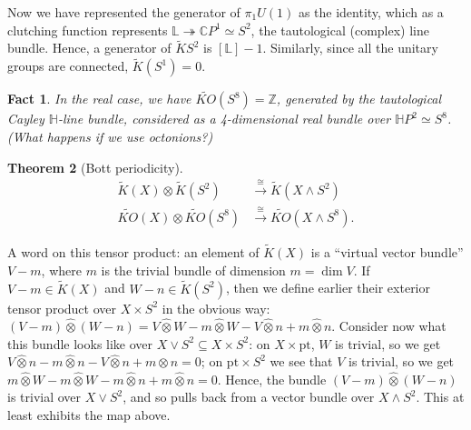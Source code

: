 \documentclass{article}
\newcommand{\Z}{\mathbb{Z}}
\newcommand{\C}{\mathbb{C}}
\newcommand{\CP}{\C P}
\newcommand{\bundle}[1]{\mathbb{#1}}
\newcommand{\sprod}{\wedge}
\newcommand{\wsum}{\vee}
\newcommand{\ptspace}{\mathrm{pt}}
\newcommand{\onto}{\twoheadrightarrow}
\renewcommand{\to}{\longrightarrow}
\newtheorem{thm}{Theorem}[section]
\newtheorem{fact}[thm]{Fact}
\theoremstyle{definition}
\begin{document}
Now we have represented the generator of $\pi_1 U(1)$ as the identity, which as a clutching function represents $\bundle{L} \onto \CP^1 \simeq S^2$, the tautological (complex) line bundle.  Hence, a generator of $\widetilde K S^2$ is $[\bundle L] - 1$.  Similarly, since all the unitary groups are connected, $\widetilde K(S^1) = 0$.

\begin{fact}
In the real case, we have $\widetilde{KO}(S^8) = \Z$, generated by the tautological Cayley $\mathbb{H}$-line bundle, considered as a 4-dimensional real bundle over $\mathbb{H}P^2 \simeq S^8$. (What happens if we use octonions?) %
\end{fact}

\begin{thm}[Bott periodicity]
\begin{align*}
\widetilde K (X) \otimes \widetilde K (S^2) & \stackrel{\cong}{\to} \widetilde K(X \sprod S^2) \\
\widetilde{KO} (X) \otimes \widetilde{KO} (S^8) & \stackrel{\cong}{\to} \widetilde{KO}(X \sprod S^8).
\end{align*}
\end{thm}

A word on this tensor product: an element of $\widetilde K (X)$ is a ``virtual vector bundle'' $V - m$, where $m$ is the trivial bundle of dimension $m = \dim V$.  If $V - m \in \widetilde K(X)$ and $W - n \in \widetilde K(S^2)$, then we define earlier their exterior tensor product over $X \times S^2$ in the obvious way: $(V - m)\hat\otimes(W - n) = V \hat\otimes W - m \hat\otimes W - V \hat\otimes n + m \hat\otimes n$.  Consider now what this bundle looks like over $X \vee S^2 \subseteq X \times S^2$: on $X \times \ptspace$, $W$ is trivial, so we get $V \hat\otimes n - m \hat\otimes n - V \hat\otimes n + m \hat\otimes n = 0$; on $\ptspace \times S^2$ we see that $V$ is trivial, so we get $m \hat\otimes W - m \hat\otimes W - m \hat\otimes n + m \hat\otimes n = 0$.  Hence, the bundle $(V - m) \hat\otimes (W - n)$ is trivial over $X \wsum S^2$, and so pulls back from a vector bundle over $X \sprod S^2$.  This at least exhibits the map above.
\end{document}

